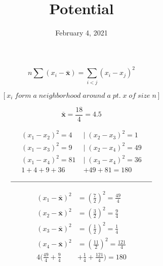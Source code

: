 \documentclass[12pt]{article}
\title{Potential\vspace{-2em}}
\date{February 4, 2021}
\begin{document}
\maketitle

\[ 
n \sum(x_i - \bm\bar{x}) = \sum_{i<j} (x_i - x_j)^2 
\]

\[
\left[ {x_i} \;form \;a \;neighborhood \;around \;a \;pt. \;x \;of \;size \;n \right]
\]

\[
\bm\bar{x} = \frac{18}{4} = 4.5
\]

\[
\begin{split}
(x_1 - x_2)^2 = 4 \;&\bigg\vert\;(x_2 - x_3)^2 = 1 \\ 
(x_1 - x_3)^2 = 9  \;&\bigg\vert\; (x_2 - x_4)^2 = 49 \\
(x_1 - x_4)^2 = 81 \;&\bigg\vert\; (x_3 - x_4)^2 = 36 \\
1 + 4 + 9 + 36& + 49 + 81 = 180 
\end{split}
\]

\[\line(1, 0) {200}\]

\[
\begin{split}
(x_1 - \bm\bar{x})^2 &= (\frac{7}{2})^2 = \frac{49}{4} \\
(x_2 - \bm\bar{x})^2 &= (\frac{3}{2})^2 = \frac{9}{4} \\ 
(x_3 - \bm\bar{x})^2 &= (\frac{1}{2})^2 = \frac{1}{4} \\ 
(x_4 - \bm\bar{x})^2 &= (\frac{11}{2})^2 = \frac{121}{4} \\
4(\frac{49}{4} + \frac{9}{4}& + \frac{1}{4} + \frac{121}{4}) = 180
\end{split}
\]

\thispagestyle{empty} 
\end{document}

